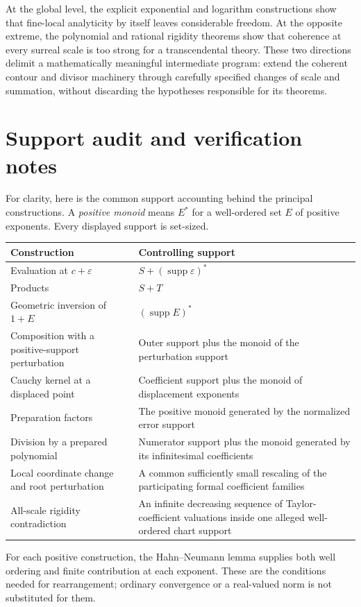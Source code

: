 \documentclass[11pt,letterpaper]{article}
\theoremstyle{definition}
\theoremstyle{remark}
\newcommand{\supp}{\operatorname{supp}}
\numberwithin{equation}{section}
\begin{document}
At the global level, the explicit exponential and logarithm constructions show that fine-local analyticity by itself leaves considerable freedom. At the opposite extreme, the polynomial and rational rigidity theorems show that coherence at every surreal scale is too strong for a transcendental theory. These two directions delimit a mathematically meaningful intermediate program: extend the coherent contour and divisor machinery through carefully specified changes of scale and summation, without discarding the hypotheses responsible for its theorems.

\appendix
\section{Support audit and verification notes}\label{app:audit}
For clarity, here is the common support accounting behind the principal constructions. A \emph{positive monoid} means $E^*$ for a well-ordered set $E$ of positive exponents. Every displayed support is set-sized.

\begin{center}\small
\begin{tabular}{@{}L{0.39\textwidth}L{0.52\textwidth}@{}}
\toprule
Construction & Controlling support\\
\midrule
Evaluation at $c+\varepsilon$ & $S+(\supp\varepsilon)^*$\\[0.3em]
Products & $S+T$\\[0.3em]
Geometric inversion of $1+E$ & $(\supp E)^*$\\[0.3em]
Composition with a positive-support perturbation & Outer support plus the monoid of the perturbation support\\[0.3em]
Cauchy kernel at a displaced point & Coefficient support plus the monoid of displacement exponents\\[0.3em]
Preparation factors & The positive monoid generated by the normalized error support\\[0.3em]
Division by a prepared polynomial & Numerator support plus the monoid generated by its infinitesimal coefficients\\[0.3em]
Local coordinate change and root perturbation & A common sufficiently small rescaling of the participating formal coefficient families\\[0.3em]
All-scale rigidity contradiction & An infinite decreasing sequence of Taylor-coefficient valuations inside one alleged well-ordered chart support\\
\bottomrule
\end{tabular}
\end{center}
For each positive construction, the Hahn--Neumann lemma supplies both well ordering and finite contribution at each exponent. These are the conditions needed for rearrangement; ordinary convergence or a real-valued norm is not substituted for them.
\end{document}
